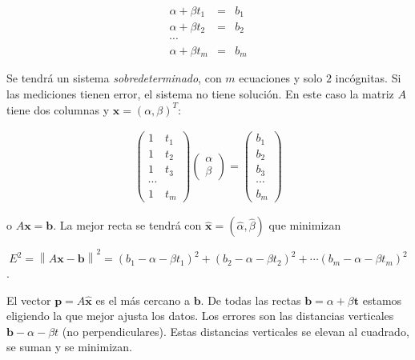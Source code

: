 {\begin{eqnarray*}
  \alpha + \beta t_1&=& b_1 \\
  \alpha + \beta t_2&=& b_2  \\
  \cdots  \\
  \alpha + \beta t_m&=& b_m
  \label{180}
\end{eqnarray*}

Se tendrá un sistema \textit{sobredeterminado}, con  $m$ ecuaciones y solo $2$ incógnitas. Si las mediciones tienen error, el sistema no tiene solución. En este caso la matriz $A$ tiene dos columnas  y $\textbf{x}=( \alpha, \beta)^T$:

\begin{eqnarray}
\left(\begin{array}{cc} 1 \quad t_1\\ 1  \quad t_2
\\  1  \quad t_3 \\ \cdots \\ 1  \quad t_m 
\end{array}\right) \left(\begin{array}{c} \alpha\\ \beta
\end{array}\right)= \left(\begin{array}{c} b_1\\ b_2
\\  b_3 \\ \cdots \\ b_m 
\end{array}\right)
\end{eqnarray}

o $A\textbf{x}=\textbf{b}$.
La mejor recta se tendrá con $\hat{\textbf{x}}= (\hat \alpha, \hat \beta)$ que minimizan 

$$E^2=\left\|A \textbf{x}-\textbf{b} \right\|^2= (b_1- \alpha- \beta t_1)^2 + (b_2- \alpha- \beta t_2)^2 +  \cdots (b_m- \alpha- \beta t_m)^2 $$.

El vector $\textbf{p}=A \hat{\textbf{x}}$ es el más cercano a $\textbf{b}$. De todas las rectas $\textbf{b}= \alpha + \beta \textbf{t}$ estamos eligiendo la que mejor ajusta los datos. 
Los errores son las distancias verticales $\textbf{b}- \alpha - \beta t$ (no perpendiculares). Estas distancias verticales se elevan al cuadrado, se suman y se minimizan.



\bigskip


 
\begin{example}
    

\end{example}}
